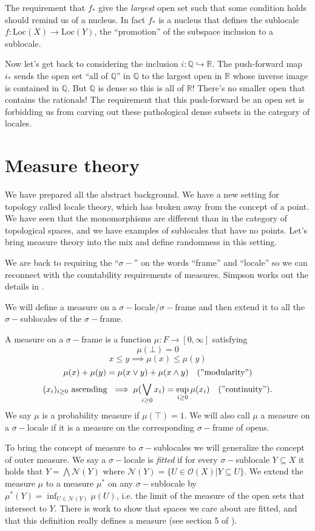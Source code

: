 \documentclass[12pt]{extarticle}
\renewcommand{\o}{\ensuremath{\mathcal{O}}}
\newcommand{\sig}{\ensuremath{\sigma-}}
\begin{document}
The requirement that $f_*$ give the \emph{largest} open set such that some condition holds should remind us of a nucleus. In fact $f_*$ is a nucleus that defines the sublocale $f:\mathrm{Loc}(X)\to \mathrm{Loc}(Y)$, the ``promotion'' of the subspace inclusion to a sublocale.

Now let's get back to considering the inclusion $i:\mathbb{Q}\hookrightarrow\mathbb{R}$. The  push-forward map $i_*$ sends the open set ``all of $\mathbb{Q}$'' in $\mathbb{Q}$ to the largest open in $\mathbb{R}$ whose inverse image is contained in $\mathbb{Q}$. But $\mathbb{Q}$ is dense so this is all of $\mathbb{R}$! There's no smaller open that contains the rationals! The requirement that this push-forward be an open set is forbidding us from carving out these pathological dense subsets in the category of locales.

\section{Measure theory}
We have prepared all the abstract background. We have a new setting for topology called locale theory, which has broken away from the concept of a point. We have seen that the monomorphisms are different than in the category of topological spaces, and we have examples of sublocales that have no points. Let's bring measure theory into the mix and define randomness in this setting.

We are back to requiring the ``\sig'' on the words ``frame'' and ``locale'' so we can reconnect with the countability requirements of measures. Simpson works out the details in \cite{simpson}.

We will define a measure on a \sig locale/\sig frame and then extend it to all the \sig sublocales of the \sig frame.

A measure on a \sig frame is a function $\mu:F\to [0,\infty]$ satisfying
$$\mu(\bot)=0$$
$$x\leq y\implies \mu(x)\leq\mu(y)$$
$$\mu(x)+\mu(y)=\mu(x\vee y)+\mu(x\wedge y)\quad\mathrm{("modularity")}$$
$$(x_i)_{i\geq 0}\mathrm{\ ascending\ }\implies \mu(\bigvee_{i\geq 0}x_i)=\sup_{i\geq 0}\mu(x_i)\quad\mathrm{("continuity")}.$$
We say $\mu$ is a probability measure if $\mu(\top)=1$. We will also call $\mu$ a measure on a \sig locale if it is a measure on the corresponding \sig frame of opens.

To bring the concept of measure to \sig sublocales we will generalize the concept of outer measure. We say a \sig locale is \emph{fitted} if for every \sig sublocale $Y\subseteq X$ it holds that $Y=\bigwedge\mathcal{N}(Y)$ where $\mathcal{N}(Y)=\{U\in\o(X)|Y\subseteq U\}$. We extend the measure $\mu$ to a measure $\mu^*$ on any \sig sublocale by $\mu^*(Y)=\inf_{U\in\mathcal{N}(Y)}\mu(U)$, i.e. the limit of the measure of the open sets that intersect to $Y$. There is work to show that spaces we care about are fitted, and that this definition really defines a measure (see section 5 of \cite{simpson}).
\end{document}
